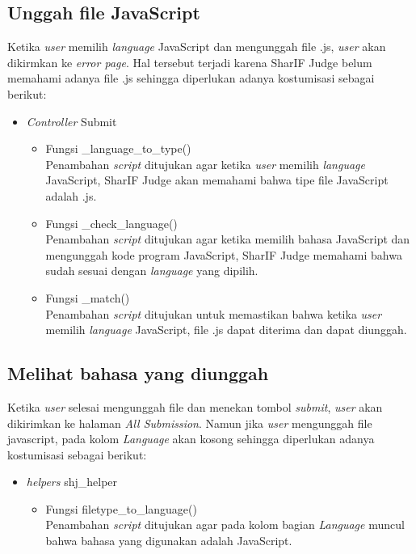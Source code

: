  \subsection{Unggah file JavaScript}
 \label{sec: Unggah file JavaScript}
 Ketika \textit{user} memilih \textit{language} JavaScript dan mengunggah file .js, \textit{user} akan dikirmkan ke \textit{error page}. Hal tersebut terjadi karena SharIF Judge belum memahami adanya file .js sehingga diperlukan adanya kostumisasi sebagai berikut: 
 
 \begin{itemize}
     \item \textit{Controller} Submit
     \begin{itemize}
        \item Fungsi \_language\_to\_type()\\ Penambahan \textit{script} ditujukan agar ketika \textit{user} memilih \textit{language} JavaScript, SharIF Judge akan memahami bahwa tipe file JavaScript adalah .js.
         \item Fungsi \_check\_language()\\
         Penambahan \textit{script} ditujukan agar ketika memilih bahasa JavaScript dan mengunggah kode program JavaScript, SharIF Judge memahami bahwa sudah sesuai dengan \textit{language} yang dipilih.
         \item Fungsi \_match()\\
         Penambahan \textit{script} ditujukan untuk memastikan bahwa ketika \textit{user} memilih \textit{language} JavaScript, file .js dapat diterima dan dapat diunggah.
     \end{itemize}
 \end{itemize}
 
 \subsection{Melihat bahasa yang diunggah}
 \label{sec: Meilihat bahasa yang diunggah}
 Ketika \textit{user} selesai mengunggah file dan menekan tombol \textit{submit}, \textit{user} akan dikirimkan ke halaman \textit{All Submission}. Namun jika \textit{user} mengunggah file javascript, pada kolom \textit{Language} akan kosong sehingga diperlukan adanya kostumisasi sebagai berikut: 
 
 \begin{itemize}
     \item \textit{helpers} shj\_helper
     \begin{itemize}
        \item Fungsi filetype\_to\_language()\\ Penambahan \textit{script} ditujukan agar pada kolom bagian \textit{Language} muncul bahwa bahasa yang digunakan adalah JavaScript.
     \end{itemize}
 \end{itemize}
 
